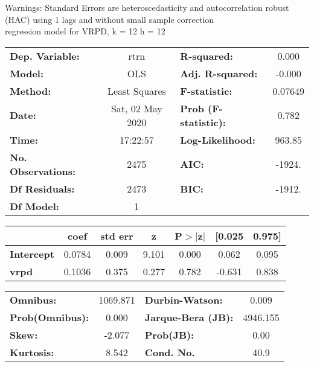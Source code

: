 Warnings: \newline
 [1] Standard Errors are heteroscedasticity and autocorrelation robust (HAC) using 1 lags and without small sample correction\\ 

regression model for VRPD, k = 12 h = 12\begin{center}
\begin{tabular}{lclc}
\toprule
\textbf{Dep. Variable:}    &       rtrn       & \textbf{  R-squared:         } &     0.000   \\
\textbf{Model:}            &       OLS        & \textbf{  Adj. R-squared:    } &    -0.000   \\
\textbf{Method:}           &  Least Squares   & \textbf{  F-statistic:       } &   0.07649   \\
\textbf{Date:}             & Sat, 02 May 2020 & \textbf{  Prob (F-statistic):} &    0.782    \\
\textbf{Time:}             &     17:22:57     & \textbf{  Log-Likelihood:    } &    963.85   \\
\textbf{No. Observations:} &        2475      & \textbf{  AIC:               } &    -1924.   \\
\textbf{Df Residuals:}     &        2473      & \textbf{  BIC:               } &    -1912.   \\
\textbf{Df Model:}         &           1      & \textbf{                     } &             \\
\bottomrule
\end{tabular}
\begin{tabular}{lcccccc}
                   & \textbf{coef} & \textbf{std err} & \textbf{z} & \textbf{P$> |$z$|$} & \textbf{[0.025} & \textbf{0.975]}  \\
\midrule
\textbf{Intercept} &       0.0784  &        0.009     &     9.101  &         0.000        &        0.062    &        0.095     \\
\textbf{vrpd}      &       0.1036  &        0.375     &     0.277  &         0.782        &       -0.631    &        0.838     \\
\bottomrule
\end{tabular}
\begin{tabular}{lclc}
\textbf{Omnibus:}       & 1069.871 & \textbf{  Durbin-Watson:     } &    0.009  \\
\textbf{Prob(Omnibus):} &   0.000  & \textbf{  Jarque-Bera (JB):  } & 4946.155  \\
\textbf{Skew:}          &  -2.077  & \textbf{  Prob(JB):          } &     0.00  \\
\textbf{Kurtosis:}      &   8.542  & \textbf{  Cond. No.          } &     40.9  \\
\bottomrule
\end{tabular}
\end{center}

